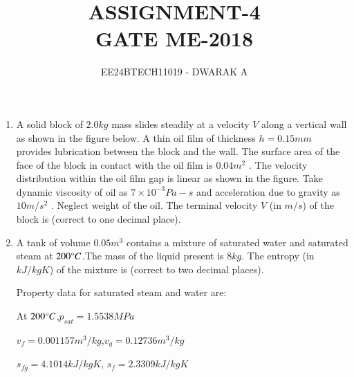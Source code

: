 \documentclass[journal]{IEEEtran}
\begin{document}

\vspace{3cm}

\title{\textbf{ASSIGNMENT-4\\GATE ME-2018}}
\author{EE24BTECH11019 - DWARAK A}
\maketitle

\bigskip

\renewcommand{\thefigure}{\theenumi}
\renewcommand{\thetable}{\theenumi}

\begin{enumerate}

\subsection*{Q.26 to Q.55 carry two marks each.}

    \item A solid block of $2.0 kg$ mass slides steadily at a velocity $V$ along a vertical wall as shown in the figure below. A thin oil film of thickness $h=0.15mm$ provides lubrication between the block and the wall. The surface area of the face of the block in contact with the oil film is $0.04 m^2$ . The velocity distribution within the oil film gap is linear as shown in the figure. Take dynamic viscosity of oil as $7\times10^{-3} Pa-s$ and acceleration due to gravity as $10 m/s^2$ . Neglect weight of the oil. The terminal velocity $V$ (in $m/s$) of the block is \underline{\hspace{1cm}} (correct to one decimal place).
        \begin{figure}[!ht]
            \centering
            
        \end{figure}

    \item A tank of volume $0.05 m^3$ contains a mixture of saturated water and saturated steam at $200\degree C$.The mass of the liquid present is $8 kg$. The entropy (in $kJ/kg K$) of the mixture is \underline{\hspace{1cm}} (correct to two decimal places).

        Property data for saturated steam and water are:

        At $200\degree C$,$p_{sat}= 1.5538 MPa$

        $v_{f} = 0.001157 m^3/kg$,$v_{g} = 0.12736 m^3/kg$

        $s_{fg} = 4.1014 kJ/kg K$, $s_{f} = 2.3309 kJ/kg K$
    

\end{enumerate}
\end{document}
